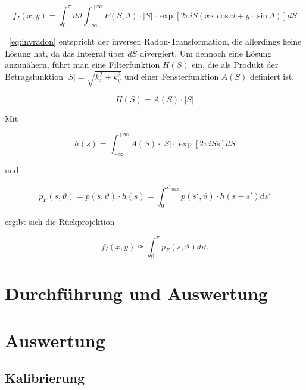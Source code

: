 \documentclass[slug=PET, room=Andreas-Schubert-Bau\,\ 424A, supervisor=Carsten\ Bittrich, coursedate=10.\ 01.\ 2020]{../../Lab_Report_LaTeX/lab_report}
\begin{document}
\begin{equation}\label{eq:invradon}
	f_I(x,y) = \int_{0}^{\pi} d\vartheta \int_{-\infty}^{+\infty} P(S, \vartheta) \cdot |S| \cdot \exp[2\pi i S(x \cdot \cos\vartheta + y \cdot \sin\vartheta)] dS
\end{equation}

~\eqref{eq:invradon} entspricht der inversen Radon-Transformation, die allerdings keine Lösung
hat, da das Integral über \(dS\) divergiert.
Um dennoch eine Lösung anzunähern, führt man eine Filterfunktion \(H(S)\) ein, die als Produkt der
Betragsfunktion \(|S| = \sqrt{k_x^2+k_y^2}\) und einer Fensterfunktion \(A(S)\) definiert ist.

\begin{equation}\label{eq:filterfkt}
	H(S) = A(S) \cdot |S|
\end{equation}

Mit

\begin{equation}\label{eq:filterkern}
	h(s) = \int_{-\infty}^{+\infty} A(S) \cdot |S| \cdot \exp[2\pi i Ss] dS
\end{equation}

und

\begin{equation}\label{eq:gefltdaten}
	p_F(s, \vartheta) = p(s, \vartheta) \cdot h(s) = \int_{0}^{s'_{max}} p(s', \vartheta) \cdot h(s-s') ds'
\end{equation}

ergibt sich die Rückprojektion

\begin{equation}\label{eq:rücktrafo}
	f_I(x,y) \approxeq \int_{0}^{\pi} p_F(s,\vartheta) d\vartheta .
\end{equation}

\section{Durchführung und Auswertung}
\label{sec:durch}



\section{Auswertung}
\label{sec:ausw}

\subsection{Kalibrierung}
\label{sec:kalib}
\end{document}
